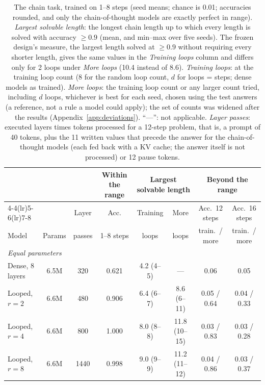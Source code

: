 \begin{table}[t]
  \centering
  \caption{The chain task, trained on 1--8 steps (seed means; chance is 0.01; accuracies rounded, and only the
  chain-of-thought models are exactly perfect in range). \emph{Largest solvable length}: the longest chain length up to
  which every length is solved with accuracy $\geq 0.9$ (mean, and min--max over five seeds). The frozen design's measure, the largest length solved at $\geq 0.9$ without requiring every shorter length, gives the
  same values in the \emph{Training loops} column and differs only for 2 loops under \emph{More loops} (10.4 instead of
  8.6). \emph{Training loops}: at the training loop count (8 for the random loop count, $d$ for loops = steps; dense
  models as trained). \emph{More loops}: the training loop count or any larger count tried, including $d$ loops,
  whichever is best for each seed, chosen using the test answers (a reference, not a rule a model could apply); the set
  of counts was widened after the results (Appendix~\ref{app:deviations}). ``---'': not applicable. \emph{Layer passes}:
  executed layers times tokens processed for a 12-step problem, that is, a prompt of 40 tokens, plus the 11 written values that precede the answer for the
  chain-of-thought models (each fed back with a KV cache; the answer itself is not processed) or 12 pause tokens.}
  \label{tab:chain}
  \footnotesize
  \setlength{\tabcolsep}{2.6pt}
  \begin{tabular}{lccccccc}
    \toprule
    & & & Within the range & \multicolumn{2}{c}{Largest solvable length} & \multicolumn{2}{c}{Beyond the range} \\
    \cmidrule(lr){4-4}\cmidrule(lr){5-6}\cmidrule(lr){7-8}
    & & Layer & Acc. & Training & More & Acc.\ 12 steps & Acc.\ 16 steps \\
    Model & Params & passes & 1--8 steps & loops & loops & train.\ / more & train.\ / more \\
    \midrule
    \multicolumn{8}{l}{\emph{Equal parameters}} \\
    Dense, 8 layers               & 6.5M & 320  & 0.621 & 4.2 (4--5)   & ---           & 0.06        & 0.05        \\
    Looped, $r=2$                 & 6.6M & 480  & 0.906 & 6.4 (6--7)   & 8.6 (6--11)   & 0.05 / 0.64 & 0.04 / 0.33 \\
    Looped, $r=4$                 & 6.6M & 800  & 1.000 & 8.0 (8--8)   & 11.8 (10--15) & 0.03 / 0.83 & 0.03 / 0.28 \\
    Looped, $r=8$                 & 6.6M & 1440 & 0.998 & 9.0 (9--9)   & 11.2 (11--12) & 0.04 / 0.86 & 0.03 / 0.37 \\

\end{tabular}
\end{table}
